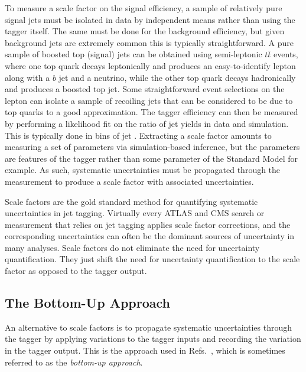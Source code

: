 To measure a scale factor on the signal efficiency, a sample of relatively pure signal jets must be isolated in data by independent means rather than using the tagger itself.
The same must be done for the background efficiency, but given background jets are extremely common this is typically straightforward.
A pure sample of boosted top (signal) jets can be obtained using semi-leptonic $t\bar{t}$ events, where one top quark decays leptonically and produces an easy-to-identify lepton along with a $b$ jet and a neutrino, while the other top quark decays hadronically and produces a boosted top jet.
Some straightforward event selections on the lepton can isolate a sample of recoiling jets that can be considered to be due to top quarks to a good approximation.
The tagger efficiency can then be measured by performing a likelihood fit on the ratio of jet yields in data and simulation.
This is typically done in bins of jet \pt.
Extracting a scale factor amounts to measuring a set of parameters via simulation-based inference, but the parameters are features of the tagger rather than some parameter of the Standard Model for example.
As such, systematic uncertainties must be propagated through the measurement to produce a scale factor with associated uncertainties.

Scale factors are the gold standard method for quantifying systematic uncertainties in jet tagging.
Virtually every ATLAS and CMS search or measurement that relies on jet tagging applies scale factor corrections, and the corresponding uncertainties can often be the dominant sources of uncertainty in many analyses.
Scale factors do not eliminate the need for uncertainty quantification.
They just shift the need for uncertainty quantification to the scale factor as opposed to the tagger output.

\subsection{The Bottom-Up Approach}

An alternative to scale factors is to propagate systematic uncertainties through the tagger by applying variations to the tagger inputs and recording the variation in the tagger output.
This is the approach used in Refs.~\cite{ATLAS:2022qby,ATLAS:2024rua}, which is sometimes referred to as the \textit{bottom-up approach}.

